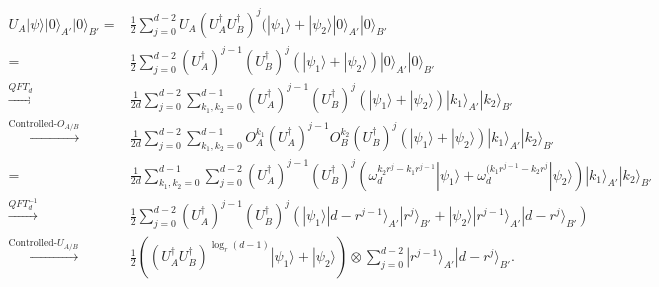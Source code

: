 \documentclass[11pt,letterpaper]{article}
\newcommand{\ket}[1]{|#1\rangle}
\newcommand{\x}{\otimes}
\newcommand{\ct}{^{\dagger}}
\DeclareMathOperator{\spn}{span}
\DeclareMathOperator{\supp}{supp}
\newcommand{\1}{\mathbb{1}}
\theoremstyle{definition}
\begin{document}
\begin{align}
	U_A \ket{\psi} \ket{0}_{A'}\ket{0}_{B'} =&  
		\frac{1}{2} \sum_{j=0}^{d-2} U_A(U_A\ct U_B\ct)^{j}(\ket{\psi_1}+\ket{\psi_2} \ket{0}_{A'}\ket{0}_{B'}\\
		=&\frac{1}{2}\sum_{j=0}^{d-2}(U_A\ct)^{j-1}  (U_B\ct)^{j} (\ket{\psi_1} + \ket{\psi_2}) \ket{0}_{A'}\ket{0}_{B'}\\
		\xrightarrow[]{QFT_d} &\frac{1}{2d}\sum_{j=0}^{d-2} \sum_{k_1,k_2 = 0}^{d-1}(U_A\ct)^{j-1} (U_B\ct)^{j} (\ket{\psi_1} + \ket{\psi_2})  \ket{k_1}_{A'}\ket{k_2}_{B'}\\
		\xrightarrow[]{\text{Controlled-}O_{A/B}}&\frac{1}{2d}\sum_{j=0}^{d-2}\sum_{k_1,k_2 = 0}^{d-1} 
		 O_A^{k_1}(U_A\ct)^{j-1} O_B^{k_2}(U_B\ct)^{j} (\ket{\psi_1} + \ket{\psi_2}) \ket{k_1}_{A'}\ket{k_2}_{B'}\\
		=& \frac{1}{2d}\sum_{k_1,k_2 = 0}^{d-1} \sum_{j=0}^{d-2} (U_A\ct)^{j-1} (U_B\ct)^{j}
		(\omega_d^{k_2r^j-k_1r^{j-1}}\ket{\psi_1}
		+\omega_d^{(k_1r^{j-1}-k_2r^j} \ket{\psi_2})
		 \ket{k_1}_{A'}\ket{k_2}_{B'}\\
		\xrightarrow[]{QFT_d^{-1}}& \frac{1}{2} \sum_{j=0}^{d-2}  (U_A\ct)^{j-1} (U_B\ct)^{ j}  
		(\ket{\psi_1} \ket{d-r^{j-1}}_{A'}\ket{r^j}_{B'}
		+ \ket{\psi_2} \ket{r^{j-1}}_{A'} \ket{d-r^j}_{B'})\\
		\xrightarrow[]{\text{Controlled-}U_{A/B}}&  \frac{1}{2} ((U_A\ct U_B\ct)^{\log_r(d-1)} \ket{\psi_1}+\ket{\psi_2}) \x  
		\sum_{j=0}^{d-2} \ket{r^{j-1}}_{A'}\ket{d-r^j}_{B'}.
\end{align}


\end{document}
